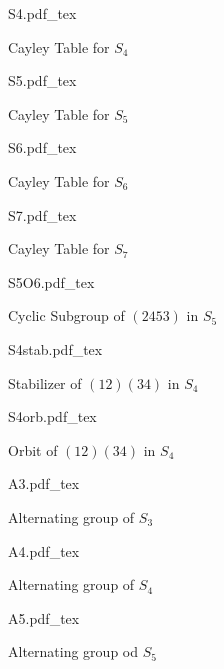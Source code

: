 \documentclass[12pt]{article}
\newcommand{\incfig}[1]{%
    \def\svgwidth{\columnwidth}
    {#1.pdf_tex}
}
\theoremstyle{definition}
\theoremstyle{definition}
\begin{document}
      \begin{figure}[htp!]
        \centering
          \incfig{S4}
          \caption{Cayley Table for $S_4$}
          \label{fig:orb}
      \end{figure}
      \begin{figure}[htp!]
        \centering
          \incfig{S5}
          \caption{Cayley Table for $S_5$}
          \label{fig:orb}
      \end{figure}
      \begin{figure}[htp!]
        \centering
          \incfig{S6}
          \caption{Cayley Table for $S_6$}
          \label{fig:orb}
      \end{figure}
      \begin{figure}[htp!]
        \centering
          \incfig{S7}
          \caption{Cayley Table for $S_7$}
          \label{fig:orb}
      \end{figure}
      \begin{figure}[htp!]
        \centering
          \incfig{S5O6}
          \caption{Cyclic Subgroup of $(2453)$ in $S_5$}
          \label{fig:orb}
      \end{figure}
      \begin{figure}[htp!]
        \centering
          \incfig{S4stab}
          \caption{Stabilizer of $(12)(34)$ in $S_4$}
          \label{fig:orb}
      \end{figure}
      \begin{figure}[htp!]
        \centering
          \incfig{S4orb}
          \caption{Orbit of $(12)(34)$ in $S_4$}
          \label{fig:orb}
      \end{figure}
      \begin{figure}[htp!]
        \centering
          \incfig{A3}
          \caption{Alternating group of $S_3$}
          \label{fig:orb}
      \end{figure}
      \begin{figure}[htp!]
        \centering
          \incfig{A4}
          \caption{Alternating group of $S_4$}
          \label{fig:orb}
      \end{figure}
      \begin{figure}[htp!]
        \centering
          \incfig{A5}
          \caption{Alternating group od $S_5$}
          \label{fig:orb}
      \end{figure}
\end{document}
